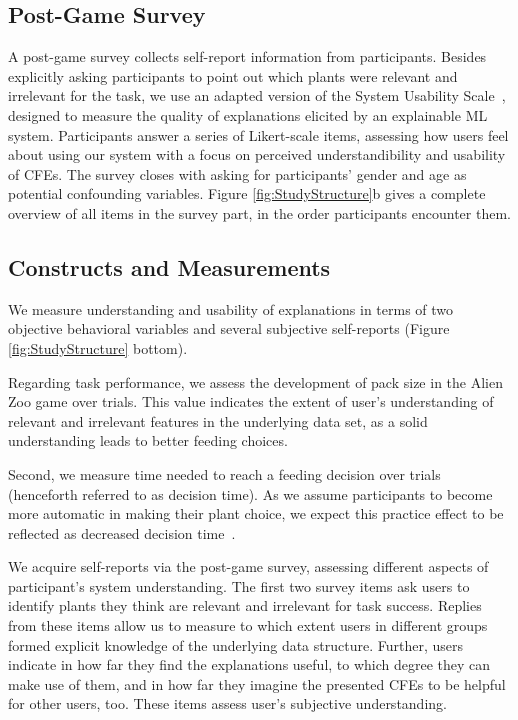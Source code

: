 \subsection{Post-Game Survey}

A post-game survey collects self-report information from participants.
Besides explicitly asking participants to point out which plants were relevant and irrelevant for the task, we use an adapted version of the System Usability Scale~\citep{holzinger_measuring_2020}, designed to measure the quality of explanations elicited by an explainable \gls{ML} system.
Participants answer a series of Likert-scale items, assessing how users feel about using our system with a focus on perceived understandibility and usability of \glspl{CFE}.
The survey closes with asking for participants' gender and age as potential confounding variables.
Figure \ref{fig:StudyStructure}b gives a complete overview of all items in the survey part, in the order participants encounter them.

\subsection{Constructs and Measurements}

We measure understanding and usability of explanations in terms of two objective behavioral variables and several subjective self-reports (Figure \ref{fig:StudyStructure} bottom). 

Regarding task performance, we assess the development of pack size in the Alien Zoo game over trials. 
This value indicates the extent of user's understanding of relevant and irrelevant features in the underlying data set, as a solid understanding leads to better feeding choices. 

Second, we measure time needed to reach a feeding decision over trials (henceforth referred to as decision time). As we assume participants to become more automatic in making their plant choice, we expect this practice effect to be reflected as decreased decision time~\citep{logan_shapes_1992}. 

We acquire self-reports via the post-game survey, assessing different aspects of participant's system understanding. 
The first two survey items ask users to identify plants they think are relevant and irrelevant for task success. 
Replies from these items allow us to measure to which extent users in different groups formed explicit knowledge of the underlying data structure. Further, users indicate in how far they find the explanations useful, to which degree they can make use of them, and in how far they imagine the presented \glspl{CFE} to be helpful for other users, too. These items assess user's subjective understanding.

